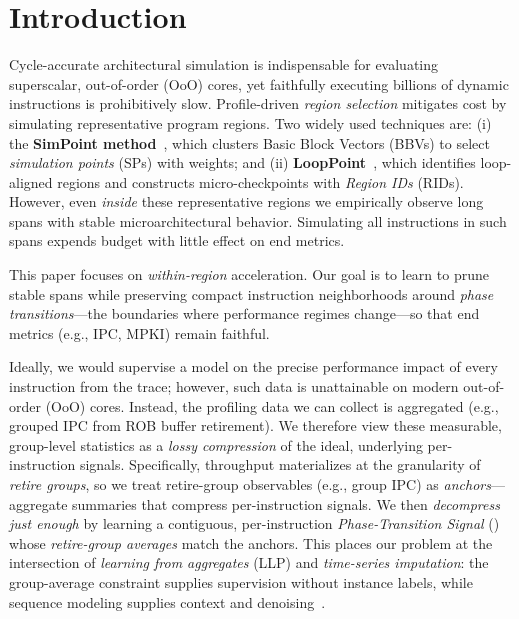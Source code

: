 \maketitle

\section{Introduction}
\label{sec:intro}

Cycle-accurate architectural simulation is indispensable for evaluating superscalar, out-of-order (OoO) cores, yet faithfully executing billions of dynamic instructions is prohibitively slow. Profile-driven \emph{region selection} mitigates cost by simulating representative program regions. Two widely used techniques are: (i) the \textbf{SimPoint method}~\cite{simpoint-asplos02,simpoint03,simpoint-howto}, which clusters Basic Block Vectors (BBVs) to select \emph{simulation points} (SPs) with weights; and (ii) \textbf{LoopPoint}~\cite{looppoint}, which identifies loop-aligned regions and constructs micro-checkpoints with \emph{Region IDs} (RIDs). However, even \emph{inside} these representative regions we empirically observe long spans with stable microarchitectural behavior. Simulating all instructions in such spans expends budget with little effect on end metrics.

This paper focuses on \emph{within-region} acceleration. Our  goal is to learn to prune stable spans while preserving compact instruction neighborhoods around \emph{phase transitions}—the boundaries where performance regimes change—so that end metrics (e.g., IPC, MPKI) remain faithful.

Ideally, we would supervise a model on the precise performance impact of every instruction from the trace; however, such data is unattainable on modern out-of-order (OoO) cores. Instead, the profiling data we can collect is aggregated (e.g., grouped IPC from ROB buffer retirement). We therefore view these measurable, group-level statistics as a \emph{lossy compression} of the ideal, underlying per-instruction signals. Specifically, throughput materializes at the granularity of \emph{retire groups}, so we treat retire-group observables (e.g., group IPC) as \emph{anchors}—aggregate summaries that compress per-instruction signals. We then \emph{decompress just enough} by learning a contiguous, per-instruction \emph{Phase-Transition Signal} (\pts) whose \emph{retire-group averages} match the anchors. This places our problem at the intersection of \emph{learning from aggregates} (LLP) and \emph{time-series imputation}: the group-average constraint supplies supervision without instance labels, while sequence modeling supplies context and denoising~\cite{yu2014-llp,scott2020-llp,law2018-agg,zhang2020-agg}.

